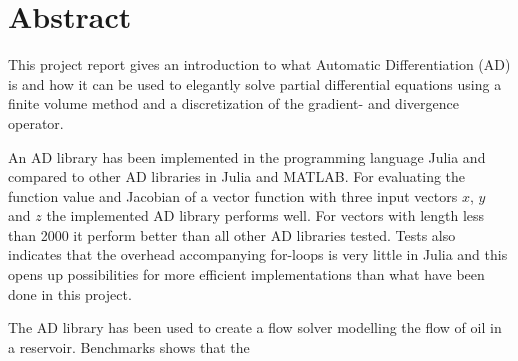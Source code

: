 \chapter*{Abstract}
This project report gives an introduction to what Automatic Differentiation (AD) is and how it can be used to elegantly solve partial differential equations using a finite volume method and a discretization of the gradient- and divergence operator. 

An AD library has been implemented in the programming language Julia and compared to other AD libraries in Julia and MATLAB. For evaluating the function value and Jacobian of a vector function with three input vectors $x$, $y$ and $z$ the implemented AD library performs well. For vectors with length less than 2000 it perform better than all other AD libraries tested. Tests also indicates that the overhead accompanying for-loops is very little in Julia and this opens up possibilities for more efficient implementations than what have been done in this project.

The AD library has been used to create a flow solver modelling the flow of oil in a reservoir. Benchmarks shows that the 

